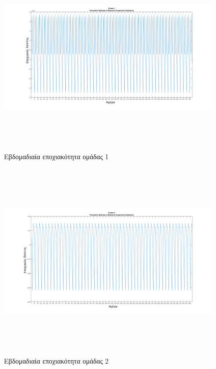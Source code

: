 \begin{figure}[ht!]
\centering
\includegraphics[width=180mm, height=100mm]{../../plots/Trend_estimation/seasonal_1.png}
\caption{Εβδομαδιαία εποχιακότητα ομάδας 1}
\label{fig:season 1}
\end{figure}
\begin{figure}[ht!]
\centering
\includegraphics[width=180mm, height=100mm]{../../plots/Trend_estimation/seasonal_2.png}
\caption{Εβδομαδιαία εποχιακότητα ομάδας 2}
\label{fig:season 2}
\end{figure}

